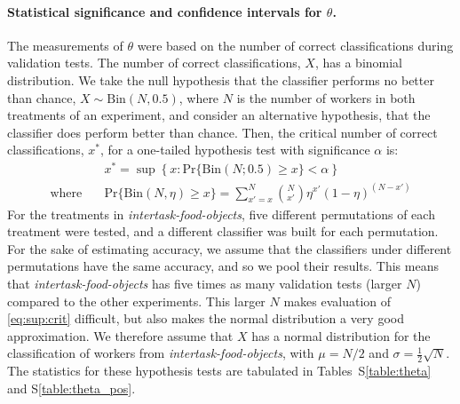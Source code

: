\documentclass[12pt]{article}
\begin{document}
\paragraph{Statistical significance and confidence intervals for $\theta$.}
The measurements of $\theta$ were based on the number of correct 
classifications during validation tests.  The number of correct 
classifications, $X$, has a binomial distribution.  
We take the null hypothesis that the classifier performs
no better than chance, $X \sim \mathrm{Bin}(N,0.5)$, where $N$ is the number 
of workers in both treatments of an experiment, and consider an alternative
hypothesis, that the classifier does perform better than chance.  Then, the 
critical number 
of correct classifications, $x^*$, for a one-tailed hypothesis test with
significance $\alpha$ is:
\begin{align}
	&x^* = \sup \left\{
			x: \mathrm{Pr}\{ \mathrm{Bin}(N;0.5) \geq x \} < \alpha
		\right\} \label{eq:sup:crit}\\
	\text{where}\quad &\mathrm{Pr}\{ \mathrm{Bin}(N,\eta) \geq x \} = 
		\sum_{x'=x}^{N} \binom{N}{x'}\eta^{x'}(1-\eta)^{(N-x')}
\end{align}
For the treatments in \textit{intertask-food-objects}, five different 
permutations of each treatment were tested, and a different classifier was 
built for each permutation.  For the sake of estimating accuracy, we assume
that the classifiers under different permutations have the same accuracy,
and so we pool their results.  This means that 
\textit{intertask-food-objects} has five times as many validation tests
(larger $N$) compared to the other experiments.  This larger $N$ makes 
evaluation of \ref{eq:sup:crit} difficult, but also makes the normal 
distribution a very good approximation.  We therefore assume 
that $X$ has a normal distribution for the classification of workers from
\textit{intertask-food-objects}, with $\mu=N/2$ and 
$\sigma = \frac{1}{2}\sqrt{N}$.  The statistics for these hypothesis tests
are tabulated in Tables~S\ref{table:theta} and S\ref{table:theta_pos}.
\end{document}
